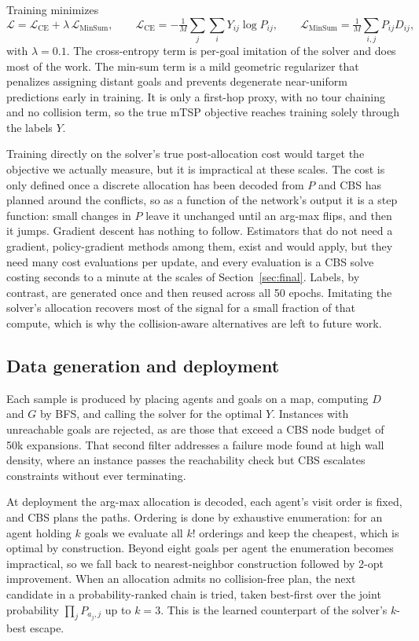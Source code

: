 \documentclass[11pt,a4paper]{article}
\begin{document}
Training minimizes
\[
\mathcal{L} = \mathcal{L}_{\mathrm{CE}} + \lambda\,\mathcal{L}_{\mathrm{MinSum}},
\qquad
\mathcal{L}_{\mathrm{CE}} = -\tfrac{1}{M}\textstyle\sum_{j}\sum_{i} Y_{ij}\log P_{ij},
\qquad
\mathcal{L}_{\mathrm{MinSum}} = \tfrac{1}{M}\textstyle\sum_{i,j} P_{ij} D_{ij},
\]
with $\lambda = 0.1$. The cross-entropy term is per-goal imitation of the solver and does most of
the work. The min-sum term is a mild geometric regularizer that penalizes assigning distant goals
and prevents degenerate near-uniform predictions early in training. It is only a first-hop proxy,
with no tour chaining and no collision term, so the true mTSP objective reaches training solely
through the labels $Y$.

Training directly on the solver's true post-allocation cost would target the objective we actually
measure, but it is impractical at these scales. The cost is only defined once a discrete allocation
has been decoded from $P$ and CBS has planned around the conflicts, so as a function of the
network's output it is a step function: small changes in $P$ leave it unchanged until an arg-max
flips, and then it jumps. Gradient descent has nothing to follow. Estimators that do not need a
gradient, policy-gradient methods among them, exist and would apply, but they need many cost
evaluations per update, and every evaluation is a CBS solve costing seconds to a minute at the
scales of Section~\ref{sec:final}. Labels, by contrast, are generated once and then reused across
all 50 epochs. Imitating the solver's allocation recovers most of the signal for a small fraction
of that compute, which is why the collision-aware alternatives are left to future work.

\subsection{Data generation and deployment}
\label{sec:deploy}

Each sample is produced by placing agents and goals on a map, computing $D$ and $G$ by BFS, and
calling the solver for the optimal $Y$. Instances with unreachable goals are rejected, as are those
that exceed a CBS node budget of 50k expansions. That second filter addresses a failure mode found
at high wall density, where an instance passes the reachability check but CBS escalates constraints
without ever terminating.

At deployment the arg-max allocation is decoded, each agent's visit order is fixed, and CBS plans
the paths. Ordering is done by exhaustive enumeration: for an agent holding $k$ goals we evaluate
all $k!$ orderings and keep the cheapest, which is optimal by construction. Beyond eight goals per
agent the enumeration becomes impractical, so we fall back to nearest-neighbor construction followed
by 2-opt improvement. When an allocation admits no
collision-free plan, the next candidate in a probability-ranked chain is tried, taken best-first
over the joint probability $\prod_j P_{a_j,j}$ up to $k=3$. This is the learned counterpart of the
solver's $k$-best escape.
\end{document}
